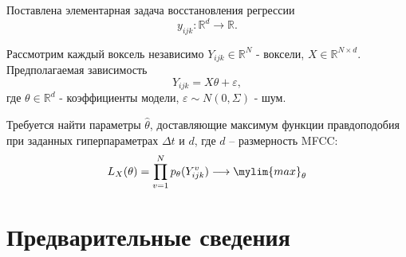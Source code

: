 \documentclass[12pt, twoside]{article}
\begin{document}
Поставлена элементарная задача восстановления регрессии
\begin{equation}
	\label{eq7}
	y_{ijk}: \mathbb{R}^{d} \to \mathbb{R}.
\end{equation}

Рассмотрим каждый воксель независимо $Y_{ijk} \in \mathbb{R}^{N}$ - воксели, $X \in \mathbb{R}^{N \times d}$. Предполагаемая зависимость
\begin{equation}
	\label{eq8}
	Y_{ijk} = X\theta + \varepsilon,
\end{equation}
где $\theta \in \mathbb{R}^d$ - коэффициенты модели, $\varepsilon \sim N(0, \Sigma)$ - шум.

Требуется найти параметры $\widehat\theta$, доставляющие максимум функции правдоподобия при заданных гиперпараметрах $\Delta t$ и $d$, где $d$ -- размерность MFCC:
\begin{equation}
	\label{eq9}
	L_X(\theta) = \prod\limits_{v=1}^N p_\theta(Y_{ijk}^v) \longrightarrow \mylim{max}_\theta
\end{equation}

\section{Предварительные сведения}





\end{document}
